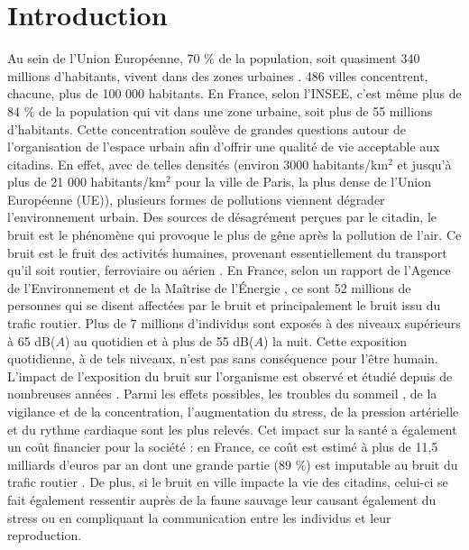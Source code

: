 \chapter*{Introduction}
\label{chap:intro}


Au sein de l'Union Européenne, 70 $\%$ de la population, soit quasiment 340 millions d'habitants, vivent dans des zones urbaines \cite{europ-commission_data_2017}. 486 villes concentrent, chacune, plus de 100 000 habitants. En France, selon l'INSEE, c'est même plus de 84 $\%$ de la population qui vit dans une zone urbaine, soit plus de 55 millions d'habitants. Cette concentration soulève de grandes questions autour de l'organisation de l'espace urbain afin d'offrir une qualité de vie acceptable aux citadins. En effet, avec de telles densités (environ 3000 habitants/km$^2$ et jusqu'à plus de 21 000  habitants/km$^2$ pour la ville de Paris, la plus dense de l'Union Européenne (UE)), plusieurs formes de pollutions viennent dégrader l'environnement urbain. Des sources de désagrément perçues par le citadin, le bruit est le phénomène qui provoque le plus de gêne après la pollution de l'air. Ce bruit est le fruit des activités humaines, provenant essentiellement du transport qu'il soit routier, ferroviaire ou aérien \cite{zannin_characterization_2013}.
En France, selon un rapport de l'Agence de l'Environnement et de la Maîtrise de l'Énergie \cite{europeens2016analyse}, ce sont 52 millions de personnes qui se disent affectées par le bruit et principalement le bruit issu du trafic routier. Plus de 7 millions d'individus sont exposés à des niveaux supérieurs à 65 dB($A$) au quotidien et à plus de 55 dB($A$) la nuit.
Cette exposition quotidienne, à de tels niveaux, n'est pas sans conséquence pour l'être humain. L'impact de l'exposition du bruit sur l'organisme est observé et étudié depuis de nombreuses années \cite{ising1980health}. Parmi les effets possibles, les troubles du sommeil \cite{pirrera2010nocturnal}, de la vigilance et de la concentration, l'augmentation du stress, de la pression artérielle et du rythme cardiaque \cite{babisch2005traffic, babisch2008road} sont les plus relevés. Cet impact sur la santé a également un coût financier pour la société : en France, ce coût est estimé à plus de 11,5 milliards d'euros par an dont une grande partie (89 $\%$) est imputable au bruit du trafic routier \cite{europeens2016analyse}. De plus, si le bruit en ville impacte la vie des citadins, celui-ci se fait également ressentir auprès de la faune sauvage \cite{dutilleux_anthropogenic_2012, francis2009noise} leur causant également du stress ou en compliquant la communication entre les individus et leur reproduction.\\

